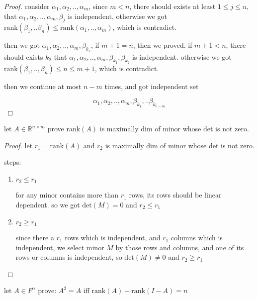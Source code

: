 \begin{proof}
    consider $\alpha_1, \alpha_2, .., \alpha_m$, since $m < n$, there should exists at least $1 \le j \le n$, that 
    $\alpha_1, \alpha_2, .., \alpha_m, \beta_j$ is independent, otherwise we got $\mathrm{rank}(\beta_1,..\beta_n) \le \mathrm{rank}(\alpha_1, .., \alpha_m)$, which is contradict.

    then we got $\alpha_1, \alpha_2, .., \alpha_m, \beta_{k_1}$, if $m+1 = n$, then we proved.
    if $m+1 < n$, there should exists $k_2$ that $\alpha_1, \alpha_2, .., \alpha_m, \beta_{k_1}, \beta_{k_2}$ is independent.
    otherwise we got $\mathrm{rank}(\beta_1,..,\beta_n) \le n \le m+1$, which is contradict.

    then we continue at most $n-m$ times, and got independent set

    \[
\alpha_1, \alpha_2, .., \alpha_m, \beta_{k_1}, .. \beta_{k_{n-m}}
    \]
\end{proof}

\begin{exercise}
    let $A \in \mathbb{R}^{n \times m}$
    prove $\mathrm{rank}(A)$ is maximally dim of minor whose det is not zero.
\end{exercise}

\begin{proof}
    let $r_1 = \mathrm{rank}(A)$ and $r_2$ is maximally dim of minor whose det is not zero.

    steps:

    \begin{enumerate}
        \item $r_2 \le r_1$

        for any minor contains more than $r_1$ rows, its rows should be linear dependent. so we got $\mathrm{det}(M) = 0$
        and $r_2 \le r_1$

        \item $r_2 \ge r_1$

        since there a $r_1$ rows which is independent, and $r_1$ columns which is independent, we
        select minor $M$ by those rows and columns, and one of its rows or columns is independent,
        so $\mathrm{det}(M) \ne 0$ and $r_2 \ge r_1$
    \end{enumerate}

\end{proof}

\begin{exercise}
    let $A \in F^n$ prove: $A^2 = A$ iff $\mathrm{rank}(A) + \mathrm{rank}(I - A) = n$
\end{exercise}

